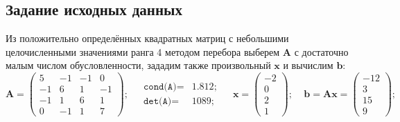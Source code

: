 \subsection{Задание исходных данных}
Из положительно определённых квадратных матриц с небольшими целочисленными значениями ранга 4 методом перебора выберем $\mathbf{A}$ с достаточно малым числом обусловленности, зададим также произвольный $\mathbf{x}$ и вычислим $\mathbf{b}$:
\[
\mathbf{A} =
\begin{pmatrix}
    5 & -1 & -1 &  0\\
   -1 &  6 &  1 & -1\\
   -1 &  1 &  6 &  1\\
    0 & -1 &  1 &  7
\end{pmatrix}; ~~~~~
\begin{matrix}
    \texttt{cond(A)}=&1.812;\\
    \texttt{det(A)} =&1089;
\end{matrix} ~~~~~
\mathbf{x} = \begin{pmatrix} -2 \\ 0 \\ 2\\ 1 \end{pmatrix}; ~~~~~
\mathbf{b=Ax} = \begin{pmatrix} -12 \\ 3 \\ 15 \\ 9 \end{pmatrix};
\]

